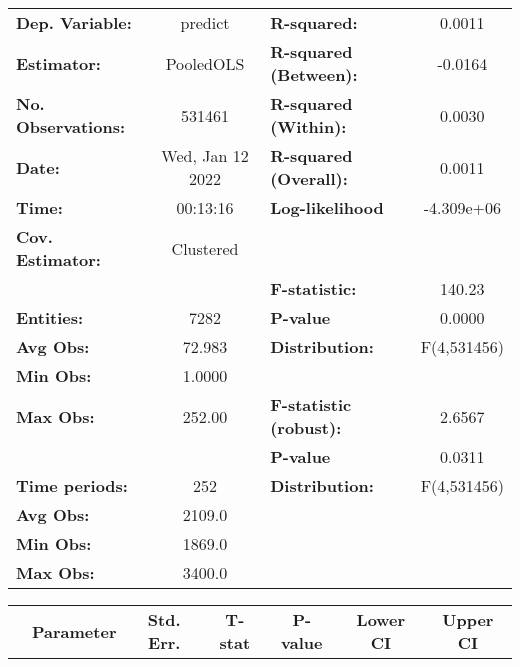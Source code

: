 \begin{center}
\begin{tabular}{lclc}
\toprule
\textbf{Dep. Variable:}    &      predict       & \textbf{  R-squared:         }   &      0.0011      \\
\textbf{Estimator:}        &     PooledOLS      & \textbf{  R-squared (Between):}  &     -0.0164      \\
\textbf{No. Observations:} &       531461       & \textbf{  R-squared (Within):}   &      0.0030      \\
\textbf{Date:}             &  Wed, Jan 12 2022  & \textbf{  R-squared (Overall):}  &      0.0011      \\
\textbf{Time:}             &      00:13:16      & \textbf{  Log-likelihood     }   &    -4.309e+06    \\
\textbf{Cov. Estimator:}   &     Clustered      & \textbf{                     }   &                  \\
\textbf{}                  &                    & \textbf{  F-statistic:       }   &      140.23      \\
\textbf{Entities:}         &        7282        & \textbf{  P-value            }   &      0.0000      \\
\textbf{Avg Obs:}          &       72.983       & \textbf{  Distribution:      }   &   F(4,531456)    \\
\textbf{Min Obs:}          &       1.0000       & \textbf{                     }   &                  \\
\textbf{Max Obs:}          &       252.00       & \textbf{  F-statistic (robust):} &      2.6567      \\
\textbf{}                  &                    & \textbf{  P-value            }   &      0.0311      \\
\textbf{Time periods:}     &        252         & \textbf{  Distribution:      }   &   F(4,531456)    \\
\textbf{Avg Obs:}          &       2109.0       & \textbf{                     }   &                  \\
\textbf{Min Obs:}          &       1869.0       & \textbf{                     }   &                  \\
\textbf{Max Obs:}          &       3400.0       & \textbf{                     }   &                  \\
\bottomrule
\end{tabular}
\begin{tabular}{lcccccc}
                & \textbf{Parameter} & \textbf{Std. Err.} & \textbf{T-stat} & \textbf{P-value} & \textbf{Lower CI} & \textbf{Upper CI}  \\

\end{tabular}
\end{center}
